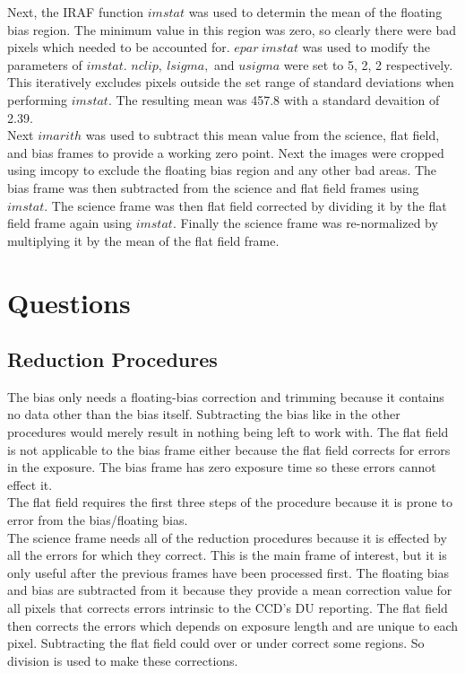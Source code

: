 \documentclass{article}
\begin{document}
Next, the IRAF function $imstat$ was used to determin the mean of the floating bias region. The minimum value in this region was zero, so clearly there were bad pixels which needed to be accounted for. $epar\ imstat$ was used to modify the parameters of $imstat$. $nclip,\ lsigma,$ and $usigma$ were set to 5, 2, 2 respectively. This iteratively excludes pixels outside the set range of standard deviations when performing $imstat$. The resulting mean was 457.8 with a standard devaition of 2.39.\\

Next $imarith$ was used to subtract this mean value from the science, flat field, and bias frames to provide a working zero point. Next the images were cropped using imcopy to exclude the floating bias region and any other bad areas. The bias frame was then subtracted from the science and flat field frames using $imstat$. The science frame was then flat field corrected by dividing it by the flat field frame again using $imstat$. Finally the science frame was re-normalized by multiplying it by the mean of the flat field frame.

\section{Questions}
\subsection{Reduction Procedures}
 The bias only needs a floating-bias correction and trimming because it contains no data other than the bias itself. Subtracting the bias like in the other procedures would merely result in nothing being left to work with. The flat field is not applicable to the bias frame either because the flat field corrects for errors in the exposure. The bias frame has zero exposure time so these errors cannot effect it.\\

The flat field requires the first three steps of the procedure because it is prone to error from the bias/floating bias. \\

The science frame needs all of the reduction procedures because it is effected by all the errors for which they correct. This is the main frame of interest, but it is only useful after the previous frames have been processed first. The floating bias and bias are subtracted from it because they provide a mean correction value for all pixels that corrects errors intrinsic to the CCD's DU reporting. The flat field then corrects the errors which depends on exposure length and are unique to each pixel. Subtracting the flat field could over or under correct some regions. So division is used to make these corrections.\\
\end{document}
